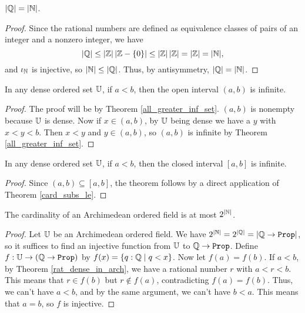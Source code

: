 \documentclass[../../math.tex]{subfiles}
\begin{document}
\begin{theorem} \label{rat_size}
    $|\mathbb{Q}| = |\mathbb{N}|$.
\end{theorem}
\begin{proof}
    Since the rational numbers are defined as equivalence classes of pairs of an
    integer and a nonzero integer, we have
    \[
        |\mathbb{Q}| \leq |\mathbb{Z}| \, |\mathbb{Z} - \{0\}| \leq |\mathbb{Z}| \, |\mathbb{Z}| = |\mathbb{Z}| = |\mathbb{N}|,
    \]
    and $\iota_{\mathbb{N}}$ is injective, so $|\mathbb{N}| \leq |\mathbb{Q}|$.  Thus, by antisymmetry, $|\mathbb{Q}| =
    |\mathbb{N}|$.
\end{proof}

\begin{theorem} \label{dense_open_infinite}
    In any dense ordered set $\mathbb{U}$, if $a < b$, then the open interval $(a, b)$
    is infinite.
\end{theorem}
\begin{proof}
    The proof will be by Theorem \ref{all_greater_inf_set}.  $(a, b)$ is
    nonempty because $\mathbb{U}$ is dense.  Now if $x \in (a, b)$, by $\mathbb{U}$ being dense
    we have a $y$ with $x < y < b$.  Then $x < y$ and $y \in (a, b)$, so $(a,
    b)$ is infinite by Theorem \ref{all_greater_inf_set}.
\end{proof}

\begin{theorem} \label{dense_closed_infinite}
    In any dense ordered set $\mathbb{U}$, if $a < b$, then the closed interval $[a, b]$
    is infinite.
\end{theorem}
\begin{proof}
    Since $(a, b) \subseteq [a, b]$, the theorem follows by a direct application
    of Theorem \ref{card_subs_le}.
\end{proof}

\begin{theorem} \label{arch_ordered_size}
    The cardinality of an Archimedean ordered field is at most $2^{|\mathbb{N}|}$.
\end{theorem}
\begin{proof}
    Let $\mathbb{U}$ be an Archimedean ordered field.  We have $2^{|\N|} = 2^{|\Q|} =
    |\Q \to \Prop|$, so it suffices to find an injective function from $\mathbb{U}$ to
    $\Q \to \Prop$.  Define $f : \U \to (\Q \to \Prop)$ by $f(x) = \{q : \mathbb{Q} \mid
    q < x\}$.  Now let $f(a) = f(b)$.  If $a < b$, by Theorem
    \ref{rat_dense_in_arch}, we have a rational number $r$ with $a < r < b$.
    This means that $r \in f(b)$ but $r \notin f(a)$, contradicting $f(a) =
    f(b)$.  Thus, we can't have $a < b$, and by the same argument, we can't have
    $b < a$.  This means that $a = b$, so $f$ is injective.
\end{proof}
\end{document}
